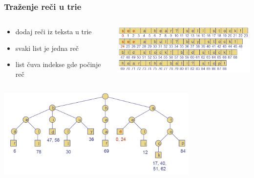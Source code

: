 \documentclass[compress]{beamer}
\begin{document}
\begin{frame}[fragile]
  \frametitle{Traženje reči u trie}
  \begin{columns}
    \begin{column}[t]{4cm}
      {\footnotesize
      \begin{itemize}
        \item dodaj reči iz teksta u trie
        \item svaki list je jedna reč
        \item list čuva indekse gde počinje reč
      \end{itemize}}
    \end{column}
    \begin{column}[t]{8cm}
      \begin{center}
        \includegraphics[width=7.5cm]{asp-13-pic19.png}
      \end{center}
    \end{column}
  \end{columns}
  \begin{center}
    \includegraphics[width=10cm]{asp-13-pic20.png}
  \end{center}
\end{frame}
\end{document}
